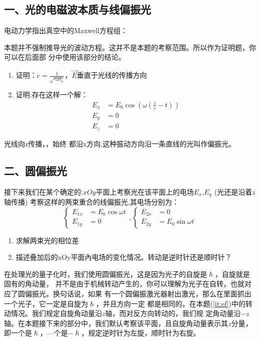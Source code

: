 \documentclass[utf8]{ctexart}
\begin{document}
\subsection*{一、光的电磁波本质与线偏振光}
电动力学指出真空中的Maxwell方程组：

本题并不强制推导光的波动方程。这并不是本题的考察范围。所以作为证明题，你可以在后面部 分中使用该部分的结论。
\begin{enumerate}
\def\labelenumi{(\arabic{enumi})}
\item
  证明：$c = \frac{1}{\sqrt{\varepsilon_0 \mu_0}}$，$\vec{E}$垂直于光线的传播方向
\item
  证明:存在这样一个解：\
  \begin{align*}
    E_{x}&=E_0 \cos(\omega (\frac{z}{c}-t))\\
    E_y&=0\\
    E_z&=0
  \end{align*}
\end{enumerate}
光线向z传播，，始终 都沿x方向,这种振动方向沿一条直线的光叫作偏振光。

\subsection*{二、圆偏振光}
接下来我们在某个确定的:$xOy$平面上考察光在该平面上的电场$E_x$,$E_y$ (光还是沿着$z$轴传播) 考察这样的两束重合的线偏振光,其电场分别为：
\[
  \begin{cases}
    E_{1x}&=E_0 \cos{\omega t}\\
    E_{1y}&=0
  \end{cases}
,
  \begin{cases}
    E_{2x}&=0\\
    E_{2y}&=E_0 \sin{\omega t}
  \end{cases}
\]
\begin{enumerate}
\def\labelenumi{(\arabic{enumi})}
\item
  求解两束光的相位差
\item
  描述叠加后的xOy平面內电场的变化情况。转动是逆时针还是顺时针？\label{it:ef}
\end{enumerate}
在处理光的量子化时，我们使用圆偏振光，这是因为光子的自旋是$\hslash $，自旋就是固有的角动量， 并不是由于机械转动产生的，你可以理解为光子在自转，也就对应了圆偏振光。换句话说，如果 有一个圆偏振激光器射出激光，那么在里面抓出一个光子，它一定是自旋为$\hslash $，并且方向一定 都是相同的。在本题(\ref{it:ef})中的转动情况。我们规定自旋角动量沿$z$轴，而对反方向转动的，我们规 定角动量沿$-z$轴。在本题接下来的部分中，我们默认考察该平面，且自旋角动量表示其$z$分量， 即一个是$\hslash $，—个是$-\hslash $，规定逆时针为左旋，顺时针为右旋。
\end{document}
